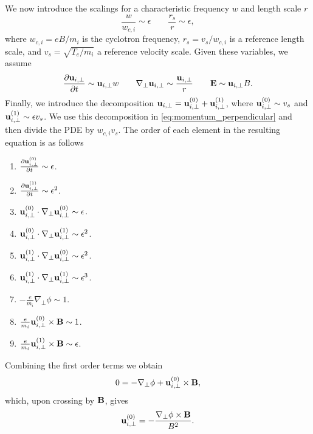 \documentclass[oneside,a4paper,11pt]{report}
\begin{document}
We now introduce the scalings for a characteristic frequency $w$ and length scale $r$
\begin{equation}
    \frac{w}{w_{c,i}} \sim \epsilon \qquad \frac{r_s}{r} \sim \epsilon,
\end{equation}
where $w_{c,i} = eB/m_i$ is the cyclotron frequency, $r_s = v_s/w_{c,i}$ is a reference length scale, and $v_s = \sqrt{T_e/m_i}$ a reference velocity scale. Given these variables, we assume
\begin{equation}
    \frac{\partial \mathbf{u}_{i,\perp}}{\partial t} \sim \mathbf{u}_{i,\perp} w \qquad \nabla_\perp \mathbf{u}_{i,\perp} \sim \frac{\mathbf{u}_{i,\perp}}{r} \qquad \mathbf{E} \sim \mathbf{u}_{i,\perp} B.
\end{equation}
Finally, we introduce the decomposition $\mathbf{u}_{i,\perp} = \mathbf{u}_{i,\perp}^{(0)} + \mathbf{u}_{i,\perp}^{(1)}$, where $\mathbf{u}_{i,\perp}^{(0)} \sim v_s$ and $\mathbf{u}_{i,\perp}^{(1)} \sim \epsilon v_s$. We use this decomposition in \cref{eq:momentum_perpendicular} and then divide the PDE by $w_{c,i} v_s$. The order of each element in the resulting equation is as follows
\begin{enumerate}
    \item $\frac{\partial \mathbf{u}_{i,\perp}^{(0)}}{\partial t} \sim \epsilon$.
    \item $\frac{\partial \mathbf{u}_{i,\perp}^{(1)}}{\partial t} \sim \epsilon^2$.
    \item $\mathbf{u}_{i,\perp}^{(0)} \cdot \nabla_\perp \mathbf{u}_{i,\perp}^{(0)} \sim \epsilon$.
    \item $\mathbf{u}_{i,\perp}^{(0)} \cdot \nabla_\perp \mathbf{u}_{i,\perp}^{(1)} \sim \epsilon^2$.
    \item $\mathbf{u}_{i,\perp}^{(1)} \cdot \nabla_\perp \mathbf{u}_{i,\perp}^{(0)} \sim \epsilon^2$.
    \item $\mathbf{u}_{i,\perp}^{(1)} \cdot \nabla_\perp \mathbf{u}_{i,\perp}^{(1)} \sim \epsilon^3$.
    \item $-\frac{e}{m_i} \nabla_\perp \phi \sim 1$.
    \item $\frac{e}{m_i} \mathbf{u}_{i,\perp}^{(0)} \times \mathbf{B} \sim 1$.
    \item $\frac{e}{m_i} \mathbf{u}_{i,\perp}^{(1)} \times \mathbf{B} \sim \epsilon$.
\end{enumerate}
Combining the first order terms we obtain
\begin{equation}
    0 = - \nabla_\perp \phi + \mathbf{u}_{i,\perp}^{(0)} \times \mathbf{B},
\end{equation}
which, upon crossing by $\mathbf{B}$, gives
\begin{equation}
\label{eq:e_cross_b_drift}
    \mathbf{u}_{i,\perp}^{(0)} = - \frac{\nabla_\perp \phi \times \mathbf{B}}{B^2}.
\end{equation}
\end{document}
